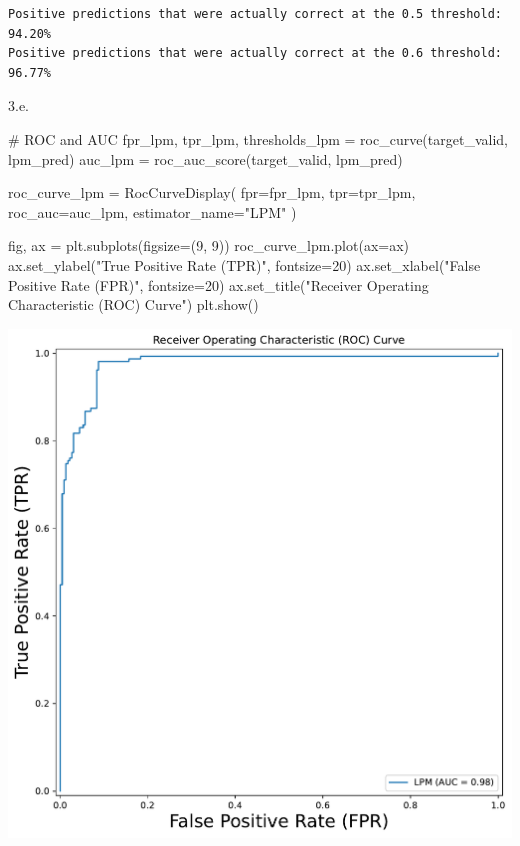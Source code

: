 \documentclass[
  11pt,
  letterpaper,
  DIV=11,
  numbers=noendperiod]{scrartcl}
\newenvironment{Shaded}{\begin{snugshade}}{\end{snugshade}}
\newcommand{\CommentTok}[1]{\textcolor[rgb]{0.37,0.37,0.37}{#1}}
\newcommand{\DecValTok}[1]{\textcolor[rgb]{0.68,0.00,0.00}{#1}}
\newcommand{\NormalTok}[1]{\textcolor[rgb]{0.00,0.23,0.31}{#1}}
\newcommand{\OperatorTok}[1]{\textcolor[rgb]{0.37,0.37,0.37}{#1}}
\newcommand{\StringTok}[1]{\textcolor[rgb]{0.13,0.47,0.30}{#1}}
\begin{document}
\begin{verbatim}
Positive predictions that were actually correct at the 0.5 threshold: 94.20%
Positive predictions that were actually correct at the 0.6 threshold: 96.77%
\end{verbatim}

3.e.

\begin{Shaded}
\begin{Highlighting}[]
\CommentTok{\# ROC and AUC}
\NormalTok{fpr\_lpm, tpr\_lpm, thresholds\_lpm }\OperatorTok{=}\NormalTok{ roc\_curve(target\_valid, lpm\_pred)}
\NormalTok{auc\_lpm }\OperatorTok{=}\NormalTok{ roc\_auc\_score(target\_valid, lpm\_pred)}

\NormalTok{roc\_curve\_lpm }\OperatorTok{=}\NormalTok{ RocCurveDisplay(}
\NormalTok{fpr}\OperatorTok{=}\NormalTok{fpr\_lpm, tpr}\OperatorTok{=}\NormalTok{tpr\_lpm,}
\NormalTok{roc\_auc}\OperatorTok{=}\NormalTok{auc\_lpm,}
\NormalTok{estimator\_name}\OperatorTok{=}\StringTok{"LPM"}
\NormalTok{)}

\NormalTok{fig, ax }\OperatorTok{=}\NormalTok{ plt.subplots(figsize}\OperatorTok{=}\NormalTok{(}\DecValTok{9}\NormalTok{, }\DecValTok{9}\NormalTok{))}
\NormalTok{roc\_curve\_lpm.plot(ax}\OperatorTok{=}\NormalTok{ax)}
\NormalTok{ax.set\_ylabel(}\StringTok{"True Positive Rate (TPR)"}\NormalTok{, fontsize}\OperatorTok{=}\DecValTok{20}\NormalTok{)}
\NormalTok{ax.set\_xlabel(}\StringTok{"False Positive Rate (FPR)"}\NormalTok{, fontsize}\OperatorTok{=}\DecValTok{20}\NormalTok{)}
\NormalTok{ax.set\_title(}\StringTok{"Receiver Operating Characteristic (ROC) Curve"}\NormalTok{)}
\NormalTok{plt.show()}
\end{Highlighting}
\end{Shaded}

\includegraphics{mp2_files/figure-pdf/cell-11-output-1.pdf}
\end{document}
